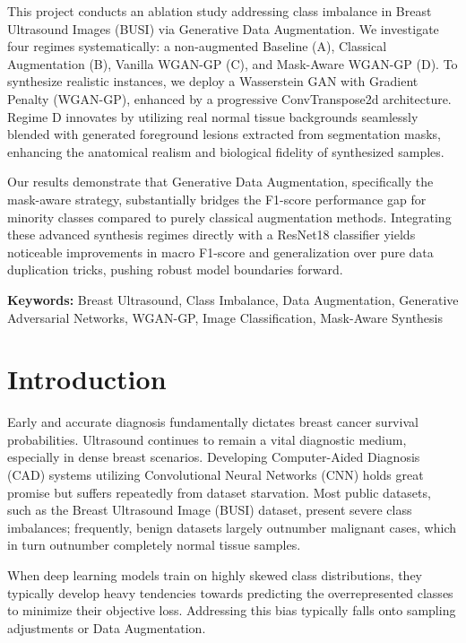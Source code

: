 \documentclass[12pt,a4paper]{article}
\begin{document}
This project conducts an ablation study addressing class imbalance in Breast Ultrasound Images (BUSI) via Generative Data Augmentation. We investigate four regimes systematically: a non-augmented Baseline (A), Classical Augmentation (B), Vanilla WGAN-GP (C), and Mask-Aware WGAN-GP (D). To synthesize realistic instances, we deploy a Wasserstein GAN with Gradient Penalty (WGAN-GP), enhanced by a progressive ConvTranspose2d architecture. Regime D innovates by utilizing real normal tissue backgrounds seamlessly blended with generated foreground lesions extracted from segmentation masks, enhancing the anatomical realism and biological fidelity of synthesized samples.

Our results demonstrate that Generative Data Augmentation, specifically the mask-aware strategy, substantially bridges the F1-score performance gap for minority classes compared to purely classical augmentation methods. Integrating these advanced synthesis regimes directly with a ResNet18 classifier yields noticeable improvements in macro F1-score and generalization over pure data duplication tricks, pushing robust model boundaries forward.

\vspace{0.5cm}
\noindent\textbf{Keywords:} Breast Ultrasound, Class Imbalance, Data Augmentation, Generative Adversarial Networks, WGAN-GP, Image Classification, Mask-Aware Synthesis



\section{Introduction}

Early and accurate diagnosis fundamentally dictates breast cancer survival probabilities. Ultrasound continues to remain a vital diagnostic medium, especially in dense breast scenarios. Developing Computer-Aided Diagnosis (CAD) systems utilizing Convolutional Neural Networks (CNN) holds great promise but suffers repeatedly from dataset starvation. Most public datasets, such as the Breast Ultrasound Image (BUSI) dataset, present severe class imbalances; frequently, benign datasets largely outnumber malignant cases, which in turn outnumber completely normal tissue samples. 

When deep learning models train on highly skewed class distributions, they typically develop heavy tendencies towards predicting the overrepresented classes to minimize their objective loss. Addressing this bias typically falls onto sampling adjustments or Data Augmentation.
\end{document}
